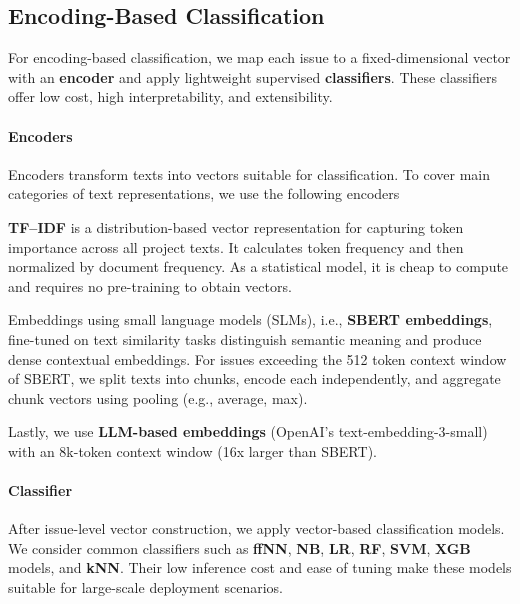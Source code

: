 \subsection{Encoding-Based Classification}
For encoding-based classification, we map each issue to a fixed-dimensional vector with an \textbf{encoder} and apply lightweight supervised \textbf{classifiers}.
These classifiers offer low cost, high interpretability, and extensibility.

\paragraph{Encoders}
Encoders transform texts into vectors suitable for classification.
To cover main categories of text representations, we use the following encoders 

\textbf{TF--IDF} is a distribution-based vector representation for capturing token importance across all project texts.
It calculates token frequency and then normalized by document frequency.
As a statistical model, it is cheap to compute and requires no pre-training to obtain vectors.

Embeddings using small language models (SLMs), i.e., \textbf{\acf{SBERT} embeddings}, fine-tuned on text similarity tasks distinguish semantic meaning and produce dense contextual embeddings.
For issues exceeding the 512 token context window of \ac{SBERT}, we split texts into chunks, encode each independently, and aggregate chunk vectors using pooling (e.g., average, max). 

Lastly, we use \textbf{\ac{LLM}-based embeddings} (OpenAI's text-embedding-3-small) with an 8k-token context window (16x larger than \ac{SBERT}).

\paragraph{Classifier}
After issue-level vector construction, we apply vector-based classification models.
We consider common classifiers such as \textbf{\ac{ffNN}}, \textbf{\ac{NB}}, \textbf{\ac{LR}}, \textbf{\ac{RF}}, \textbf{\ac{SVM}}, \textbf{\ac{XGB}} models, and \textbf{\ac{kNN}}.
Their low inference cost and ease of tuning make these models suitable for large-scale deployment scenarios.


